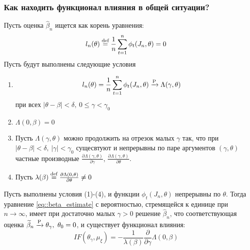 \subsubsection*{Как находить функционал влияния в общей ситуации?}
Пусть оценка $\widehat{\beta}_n$ ищется как корень уравнения:
\begin{equation}\label{eq::beta_estimate}
    l_n(\theta)\defeq \frac{1}{n}\sum_{t=1}^n\phi_t(J_n, \theta)=0
\end{equation}
Пусть будут выполнены следующие условия
\begin{enumerate}
    \item \[l_n(\theta)=\frac{1}{n}\sum_{t=1}^n\phi_t(J_n,\theta)\xrightarrow{\P}\Lambda(\gamma,\theta)\]
        при всех $\lvert\theta-\beta\rvert<\delta,\ 0\leq\gamma<\gamma_0$
    \item $\Lambda(0,\beta)=0$
    \item Пусть $\Lambda(\gamma,\theta)$ можно продолжить на отрезок малых $\gamma$ так,
    что при $\lvert\theta-\beta\rvert<\delta,\ \lvert\gamma\rvert<\gamma_0$ сущесвтуют
    и непрерывны по паре аргументов $(\gamma,\theta)$ частные производные
    $\frac{\partial\Lambda(\gamma,\theta)}{\partial\gamma}$, $\frac{\partial\Lambda(\gamma,\theta)}{\partial\theta}$.
    \item Пусть $\lambda(\beta)\defeq\frac{\partial\Lambda(0,\theta)}{\partial\theta}\neq0$
\end{enumerate}
\begin{theorem} \label{th::M_estimate_sample_median}
    Пусть выполнены условия (1)-(4), и функции $\phi_t(J_n,\theta)$ непрерывны по $\theta$.
    Тогда уравнение \eqref{eq::beta_estimate} с вероятностью, стремящейся к единице при $n\rightarrow\infty$,
    имеет при достаточно малых $\gamma>0$ решение $\widehat{\beta}_n$, что соответствующая
    оценка $\widetilde{\beta}_n\xrightarrow{\P}\theta_\gamma,\ \theta_0=0$, и существует
    функционал влияния:
    \[\boxed{IF(\theta_\gamma,\mu_\xi)=-\frac{1}{\lambda(\beta)}\frac{\partial}{\partial\gamma}\Lambda(0,\beta)}\]
\end{theorem}
